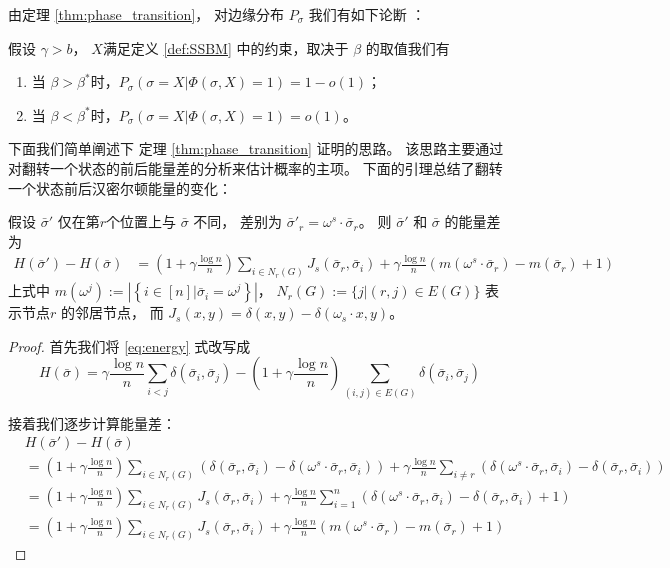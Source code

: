 由定理 \ref{thm:phase_transition}， 对边缘分布 $P_{\sigma}$ 我们有如下论断
：
\begin{corollary}\label{cor:phase4}
假设 $\gamma > b$， $X$满足定义 \ref{def:SSBM} 中的约束，取决于 $\beta$ 的取值我们有
\begin{enumerate}
	\item 当 $\beta > \beta^*$时，$P_{\sigma}(\sigma = X | \Phi(\sigma, X)=1)  = 1-o(1)$；
	\item 当 $\beta < \beta^*$时，$P_{\sigma}(\sigma = X | \Phi(\sigma, X)=1)  = o(1)$。
\end{enumerate}
\end{corollary}

下面我们简单阐述下 定理 \ref{thm:phase_transition} 证明的思路。
该思路主要通过对翻转一个状态的前后能量差的分析来估计概率的主项。
下面的引理总结了翻转一个状态前后汉密尔顿能量的变化：
\begin{lemma}\label{lem:lemmaDiff}
	假设 $\bar{\sigma}'$ 仅在第$r$个位置上与 $\bar{\sigma}$ 不同，
	差别为 $\bar{\sigma}'_r = \omega^s \cdot \bar{\sigma}_r$。
	则 $\bar{\sigma}'$ 和 $\bar{\sigma}$ 的能量差为
\begin{align}
	H(\bar{\sigma}') - H(\bar{\sigma}) &= \left(1+\gamma \frac{\log n}{n} \right)
	\sum_{i \in N_r(G)} J_s(\bar{\sigma}_r, \bar{\sigma}_i)
	+ \gamma \frac{\log n}{n} (m(\omega^s \cdot \bar{\sigma}_r)-m(\bar{\sigma}_r)+1) \label{eq:DeltaH}
	\end{align}
	上式中 $m(\omega^j) := \left|\left\{i \in [n] | \bar{\sigma}_i = \omega^j \right\} \right| $，
	$N_r(G):=\{j | (r, j) \in E(G) \}$ 表示节点$r$
	的邻居节点，
	而 $J_s(x, y) = \delta(x, y) - \delta(\omega_s \cdot x, y)$。
\end{lemma}
\begin{proof}
	首先我们将
  \eqref{eq:energy} 式改写成
	\begin{equation*}
	H(\bar{\sigma}) = \gamma \frac{\log n}{n} \sum_{i < j} \delta(\bar{\sigma}_i, \bar{\sigma}_j)
	- \left(1 + \gamma\frac{\log n}{n} \right)
	\sum_{ (i,j) \in E(G)} \delta(\bar{\sigma}_i, \bar{\sigma}_j)
	\end{equation*}
	
	接着我们逐步计算能量差：
  \begin{align*}
	& 　H(\bar{\sigma}') - H(\bar{\sigma}) \\
	& =
  \left(1 + \gamma\frac{\log n}{n}
  \right)
  \sum_{i \in N_r(G)} (\delta(\bar{\sigma}_r, \bar{\sigma}_i) -
	\delta(\omega^s \cdot \bar{\sigma}_r, \bar{\sigma}_i))
	 + \gamma \frac{\log n}{n}\sum_{i\neq r}
	( \delta(\omega^s \cdot \bar{\sigma}_r, \bar{\sigma}_i) -
	\delta( \bar{\sigma}_r, \bar{\sigma}_i) ) \\
	& = \left(
     1 + \gamma\frac{\log n}{n}
     \right)
   \sum_{i \in N_r(G)} J_s(\bar{\sigma}_r, \bar{\sigma}_i) 
	+ \gamma \frac{\log n}{n}\sum_{i=1}^n
	( \delta(\omega^s \cdot \bar{\sigma}_r, \bar{\sigma}_i) -
	\delta( \bar{\sigma}_r, \bar{\sigma}_i) +1) \\
	&= \left(1+\gamma \frac{\log n}{n}
  \right)
  \sum_{i \in N_r(G)} J_s(\bar{\sigma}_r, \bar{\sigma}_i)
	+ \gamma \frac{\log n}{n} (m(\omega^s \cdot \bar{\sigma}_r)-m(\bar{\sigma}_r)+1)
	\end{align*}
\end{proof}
